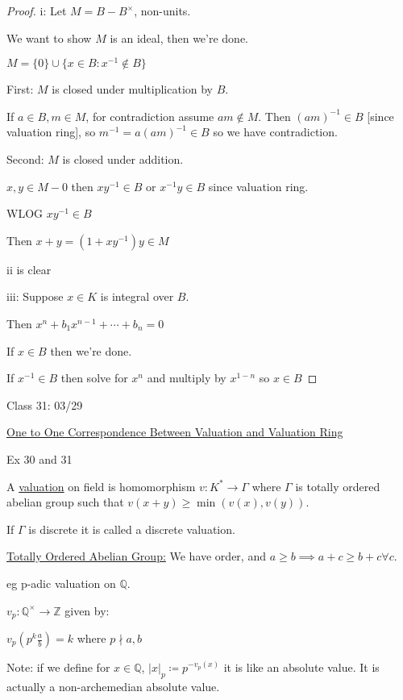 \documentclass{article}
\theoremstyle{definition}
\begin{document}
\begin{proof}
    i: Let \(M = B - B^\times\), non-units.
    
    We want to show \(M\) is an ideal, then we're done.

    \(M= \{ 0 \} \cup \{ x\in B : x ^{-1} \notin B \} \)

    First: \(M\) is closed under multiplication by \(B\).

    If \(a\in B,m\in M\), for contradiction assume \(am\notin M\). Then \((am)^{-1} \in B\) [since valuation ring], so \(m ^{-1} = a (am) ^{-1} \in B\) so we have contradiction.
   
    Second: \(M\) is closed under addition.

    \(x,y\in M - 0\) then \(x y ^{-1} \in B\) or \(x ^{-1} y\in B\) since valuation ring.
    
    WLOG \(x y ^{-1} \in B\)
    
    Then \(x+y = (1 + x y ^{-1}) y \in M\) 

    ii is clear

    iii: Suppose \(x\in K\) is integral over \(B\).

    Then \(x ^n + b_1 x^{n-1} + \cdots + b_n = 0 \)
    
    If \(x\in B\) then we're done.

    If \(x ^{-1} \in B\) then solve for \(x^n\) and multiply by \(x^{1-n}\) so \(x\in B\) 

\end{proof}

\hrulefill

Class 31: 03/29

\underline{One to One Correspondence Between Valuation and Valuation Ring} 

Ex 30 and 31

A \underline{valuation} on field is homomorphism \(v: K^{\ast} \to \Gamma\) where \(\Gamma\) is totally ordered abelian group such that \(v(x+y) \geq \min(v(x),v(y))\).

If \(\Gamma\) is discrete it is called a discrete valuation. 

\underline{Totally Ordered Abelian Group:} We have order, and \(a \geq b \implies a+c \geq b+c \forall c\). 

eg p-adic valuation on \(\mathbb{Q}\).

\(v_p:\mathbb{Q}^\times \to \mathbb{Z}\) given by:

\(v_p(p^k \frac{a}{b})=k\) where \(p\nmid a,b\)

Note: if we define for \(x\in\mathbb{Q}\),  \(\vert x \vert_p \coloneqq p^{- v_p(x)}\) it is like an absolute value. It is actually a non-archemedian absolute value.
\end{document}
